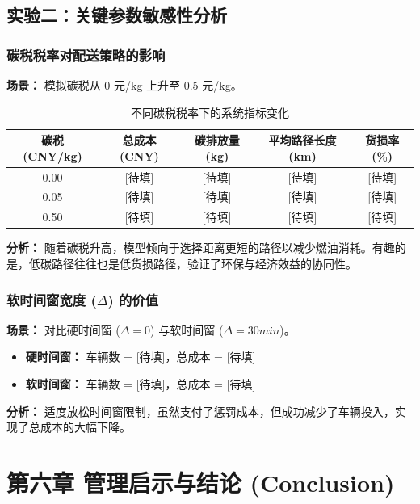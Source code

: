 \documentclass[11pt, a4paper]{article}
\begin{document}
\subsection{实验二：关键参数敏感性分析}

\subsubsection{碳税税率对配送策略的影响}
\textbf{场景：} 模拟碳税从 0 元/kg 上升至 0.5 元/kg。

\begin{table}[H]
    \centering
    \caption{不同碳税税率下的系统指标变化}
    \label{tab:carbon_tax}
    \begin{tabular}{@{}ccccc@{}}
    \toprule
    \textbf{碳税 (CNY/kg)} & \textbf{总成本 (CNY)} & \textbf{碳排放量 (kg)} & \textbf{平均路径长度 (km)} & \textbf{货损率 (\%)} \\
    \midrule
    0.00 & [待填] & [待填] & [待填] & [待填] \\
    0.05 & [待填] & [待填] & [待填] & [待填] \\
    0.50 & [待填] & [待填] & [待填] & [待填] \\
    \bottomrule
    \end{tabular}
\end{table}

\noindent \textbf{分析：} 随着碳税升高，模型倾向于选择距离更短的路径以减少燃油消耗。有趣的是，低碳路径往往也是低货损路径，验证了环保与经济效益的协同性。

\subsubsection{软时间窗宽度 ($\Delta$) 的价值}
\textbf{场景：} 对比硬时间窗 ($\Delta=0$) 与软时间窗 ($\Delta=30min$)。

\begin{itemize}
    \item \textbf{硬时间窗：} 车辆数 = [待填]，总成本 = [待填]
    \item \textbf{软时间窗：} 车辆数 = [待填]，总成本 = [待填]
\end{itemize}

\noindent \textbf{分析：} 适度放松时间窗限制，虽然支付了惩罚成本，但成功减少了车辆投入，实现了总成本的大幅下降。

\section{第六章 管理启示与结论 (Conclusion)}
\end{document}
